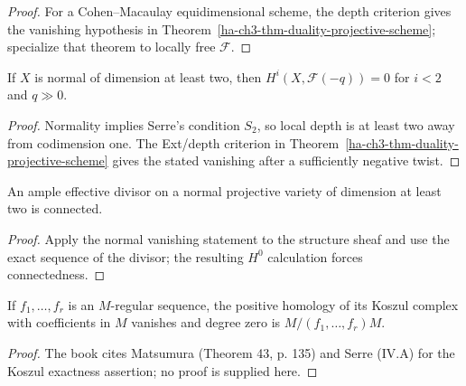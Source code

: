 \begin{proof}

For a Cohen--Macaulay equidimensional scheme, the depth criterion gives the vanishing hypothesis in
Theorem~\ref{ha-ch3-thm-duality-projective-scheme}; specialize that theorem to locally free
$\mathcal F$.

\end{proof}
\begin{corollary}\label{ha-ch3-cor-normal-vanishing}
If $X$ is normal of dimension at least two, then
$H^i(X,\mathcal F(-q))=0$ for $i<2$ and $q\gg0$.
\end{corollary}
\begin{proof}

Normality implies Serre's condition $S_2$, so local depth is at least two away from codimension one.
The Ext/depth criterion in Theorem~\ref{ha-ch3-thm-duality-projective-scheme} gives the stated
vanishing after a sufficiently negative twist.

\end{proof}
\begin{corollary}\label{ha-ch3-cor-connected-divisor}
An ample effective divisor on a normal projective variety of dimension at least
two is connected.

\end{corollary}
\begin{proof}

Apply the normal vanishing statement to the structure sheaf and use the exact
sequence of the divisor; the resulting $H^0$ calculation forces connectedness.

\end{proof}
\begin{proposition}\label{ha-ch3-prop-koszul}
If $f_1,\ldots,f_r$ is an $M$-regular sequence, the positive homology of its
Koszul complex with coefficients in $M$ vanishes and degree zero is
$M/(f_1,\ldots,f_r)M$.

\end{proposition}
\begin{proof}

The book cites Matsumura (Theorem 43, p. 135) and Serre (IV.A) for the
Koszul exactness assertion; no proof is supplied here.

\end{proof}

